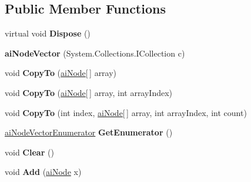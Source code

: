 \subsection*{Public Member Functions}
\begin{DoxyCompactItemize}
\item 
\hypertarget{classai_node_vector_a5f4c8741ab1814f14bf06242bd0d50a3}{virtual void {\bfseries Dispose} ()}\label{classai_node_vector_a5f4c8741ab1814f14bf06242bd0d50a3}

\item 
\hypertarget{classai_node_vector_a2bd391e3fba44f86d8dddcffb56af958}{{\bfseries ai\+Node\+Vector} (System.\+Collections.\+I\+Collection c)}\label{classai_node_vector_a2bd391e3fba44f86d8dddcffb56af958}

\item 
\hypertarget{classai_node_vector_a3af3e50dc189f63eadf71356a77eb659}{void {\bfseries Copy\+To} (\hyperlink{structai_node}{ai\+Node}\mbox{[}$\,$\mbox{]} array)}\label{classai_node_vector_a3af3e50dc189f63eadf71356a77eb659}

\item 
\hypertarget{classai_node_vector_a35f22f026cf04633e315192888320386}{void {\bfseries Copy\+To} (\hyperlink{structai_node}{ai\+Node}\mbox{[}$\,$\mbox{]} array, int array\+Index)}\label{classai_node_vector_a35f22f026cf04633e315192888320386}

\item 
\hypertarget{classai_node_vector_ab12e8fde305056c1b638c6ac66d6ed80}{void {\bfseries Copy\+To} (int index, \hyperlink{structai_node}{ai\+Node}\mbox{[}$\,$\mbox{]} array, int array\+Index, int count)}\label{classai_node_vector_ab12e8fde305056c1b638c6ac66d6ed80}

\item 
\hypertarget{classai_node_vector_a2158660613b076805774f4c245f1fe1a}{\hyperlink{classai_node_vector_1_1ai_node_vector_enumerator}{ai\+Node\+Vector\+Enumerator} {\bfseries Get\+Enumerator} ()}\label{classai_node_vector_a2158660613b076805774f4c245f1fe1a}

\item 
\hypertarget{classai_node_vector_a52c98e3633b30f813c2929903ae5f1ed}{void {\bfseries Clear} ()}\label{classai_node_vector_a52c98e3633b30f813c2929903ae5f1ed}

\item 
\hypertarget{classai_node_vector_a40bf8c4773ea33993c9a3950b7eb4c48}{void {\bfseries Add} (\hyperlink{structai_node}{ai\+Node} x)}\label{classai_node_vector_a40bf8c4773ea33993c9a3950b7eb4c48}


\end{DoxyCompactItemize}
